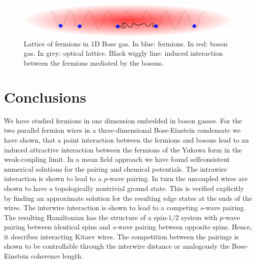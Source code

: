 \documentclass[11pt, twoside]{Thesis}
\begin{document}
\vspace{2.5cm}

\begin{figure}[H]
\center
\includegraphics[width=1\columnwidth]{gasandlattice.eps}
\\ Lattice of fermions in 1D Bose gas. In blue: fermions. In red: boson gas. In grey: optical lattice. Black wiggly line: induced interaction between the fermions mediated by the bosons.   
\end{figure}

\newpage



\part{Conclusions}
\chead{}
We have studied fermions in one dimension embedded in boson gasses. For the two parallel fermion wires in a three-dimensional Bose-Einstein condensate we have shown, that a point interaction between the fermions and bosons lead to an induced attractive interaction between the fermions of the Yukawa form in the weak-coupling limit. In a mean field approach we have found selfconsistent numerical solutions for the pairing and chemical potentials. The intrawire interaction is shown to lead to a $p$-wave pairing. In turn the uncoupled wires are shown to have a topologically nontrivial ground state. This is verified explicitly by finding an approximate solution for the resulting edge states at the ends of the wires. The interwire interaction is shown to lead to a competing $s$-wave pairing. The resulting Hamiltonian has the structure of a spin-$1/2$ system with $p$-wave pairing between identical spins and $s$-wave pairing between opposite spins. Hence, it describes interacting Kitaev wires. The competition between the pairings is shown to be controllable through the interwire distance or analogously the Bose-Einstein coherence length. 
\end{document}

